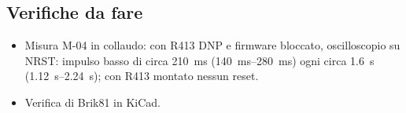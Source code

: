 \subsection{Verifiche da fare}
\begin{itemize}
\item Misura M-04 in collaudo: con R413 DNP e firmware bloccato, oscilloscopio su NRST: impulso basso di circa \SI{210}{\milli\second} (\SIrange{140}{280}{\milli\second}) ogni circa \SI{1,6}{\second} (\SIrange{1,12}{2,24}{\second}); con R413 montato nessun reset.
\item Verifica di Brik81 in KiCad.
\end{itemize}
